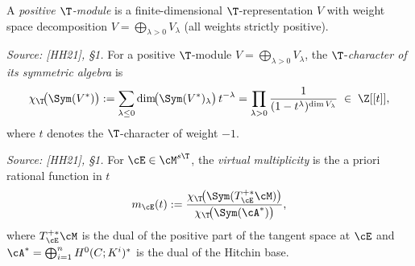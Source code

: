\begin{definition}
  \label{def:T_pos_module}
  \uses{}
  A \emph{positive \(\T\)-module} is a finite-dimensional \(\T\)-representation \(V\) with weight
  space decomposition \(V = \bigoplus_{\lambda > 0} V_\lambda\) (all weights strictly positive).
\end{definition}

\begin{definition}
  \label{def:T_char_sym}
  \textit{Source: [HH21], §1.}
  For a positive \(\T\)-module \(V = \bigoplus_{\lambda > 0} V_\lambda\), the
  \(\T\)-\emph{character of its symmetric algebra} is
  \[
    \chi_{\T}\!\bigl(\Sym(V^*)\bigr)
    := \sum_{\lambda \leq 0} \dim\!\bigl(\Sym(V^*)_\lambda\bigr)\, t^{-\lambda}
    = \prod_{\lambda > 0} \frac{1}{(1 - t^{\lambda})^{\dim V_\lambda}}
    \;\in\; \Z[[t]],
  \]
  where \(t\) denotes the \(\T\)-character of weight \(-1\).
\end{definition}

\begin{definition}
  \label{def:virtual_multiplicity}
  \textit{Source: [HH21], §1.}
  For \(\cE \in \cM^{s\T}\), the \emph{virtual multiplicity} is the a priori rational function
  in \(t\)
  \[
    m_{\cE}(t)
    := \frac{\chi_{\T}\!\bigl(\Sym(T^{+*}_{\cE}\cM)\bigr)}
            {\chi_{\T}\!\bigl(\Sym(\cA^*)\bigr)},
  \]
  where \(T^{+*}_{\cE}\cM\) is the dual of the positive part of the tangent space at \(\cE\)
  and \(\cA^* = \bigoplus_{i=1}^n H^0(C;K^i)^*\) is the dual of the Hitchin base.
\end{definition}

